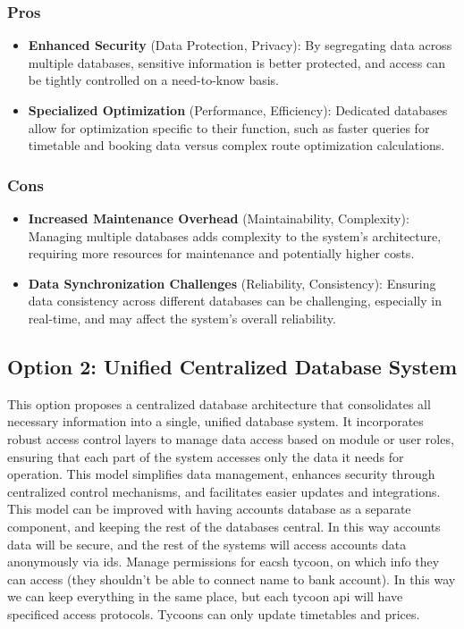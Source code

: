 \subsubsection*{Pros}
\begin{itemize}[noitemsep]
    \item \textbf{Enhanced Security} (Data Protection, Privacy): By segregating data across multiple databases, sensitive information is better protected, and access can be tightly controlled on a need-to-know basis.
    \item \textbf{Specialized Optimization} (Performance, Efficiency): Dedicated databases allow for optimization specific to their function, such as faster queries for timetable and booking data versus complex route optimization calculations.
\end{itemize}

\subsubsection*{Cons}
\begin{itemize}[noitemsep]
    \item \textbf{Increased Maintenance Overhead} (Maintainability, Complexity): Managing multiple databases adds complexity to the system's architecture, requiring more resources for maintenance and potentially higher costs.
    \item \textbf{Data Synchronization Challenges} (Reliability, Consistency): Ensuring data consistency across different databases can be challenging, especially in real-time, and may affect the system's overall reliability.
\end{itemize}

\subsection*{Option 2: Unified Centralized Database System}

This option proposes a centralized database architecture that consolidates all necessary information into a single, unified database system. It incorporates robust access control layers to manage data access based on module or user roles, ensuring that each part of the system accesses only the data it needs for operation. This model simplifies data management, enhances security through centralized control mechanisms, and facilitates easier updates and integrations. This model can be improved with having accounts database as a separate component, and keeping the rest of the databases central. In this way accounts data will be secure, and the rest of the systems will access accounts data anonymously via ids. Manage permissions for eacsh tycoon, on which info they can access (they shouldn't be able to connect name to bank account). In this way we can keep everything in the same place, but each tycoon api will have specificed access protocols. Tycoons can only update timetables and prices.

